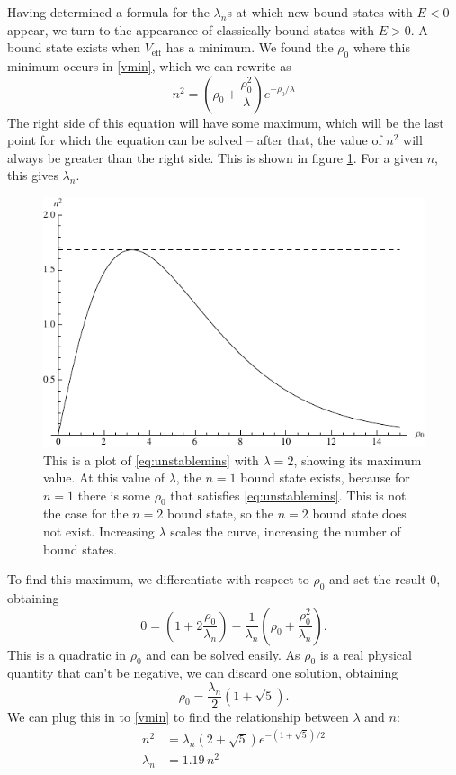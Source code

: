 \documentclass[12pt,twoside]{reedthesis}
\begin{document}
Having determined a formula for the $\lambda_n$s at which new bound states with $E < 0$ appear, we turn to the appearance of classically bound states with $E > 0$. A bound state exists when $V_{\mathrm{eff}}$ has a minimum. We found the $\rho_0$ where this minimum occurs in \eqref {vmin}, which we can rewrite as
\begin{equation}
n^2 = \left( \rho_0 + \frac{\rho_0^2}{\lambda} \right) e^{-\rho_0/\lambda}
\label{eq:unstablemins}
\end{equation}
The right side of this equation will have some maximum, which will be the last point for which the equation can be solved -- after that, the value of $n^2$ will always be greater than the right side. This is shown in figure \ref{fig:unstableveff}. For a given $n$, this gives $\lambda_n$.
\begin{figure}[h]
\centering
\includegraphics{Figures/unstableveff}
\caption[$n^2$ as a function of $\rho_0$]{This is a plot of \eqref{eq:unstablemins} with $\lambda = 2$, showing its maximum value. At this value of $\lambda$, the $n = 1$ bound state exists, because for $n = 1$ there is some $\rho_0$ that satisfies \eqref{eq:unstablemins}. This is not the case for the $n = 2$ bound state, so the $n = 2$ bound state does not exist. Increasing $\lambda$ scales the curve, increasing the number of bound states.}
\label{fig:unstableveff}
\end{figure}
To find this maximum, we differentiate with respect to $\rho_0$ and set the result 0, obtaining
\begin{equation}
0 = (1+2 \frac{\rho_0}{\lambda_n}) - \frac{1}{\lambda_n}(\rho_0 + \frac{\rho_0^2}{\lambda_n})\mbox{.} 
\end{equation}
This is a quadratic in $\rho_0$ and can be solved easily.
As $\rho_0$ is a real physical quantity that can't be negative, we can discard one solution, obtaining
\begin{equation}
\rho_0 = \frac{\lambda_n}{2}(1+\sqrt{5})\mbox{.}
\end{equation}
We can plug this in to \eqref{vmin} to find the relationship between $\lambda$ and $n$:
\begin{align}
n^2 &= \lambda_{n}(2 + \sqrt{5})e^{-(1+ \sqrt{5})/2} \\
\lambda_n &= 1.19\, n^2
\label{eq:unstable}
\end{align}
\end{document}
